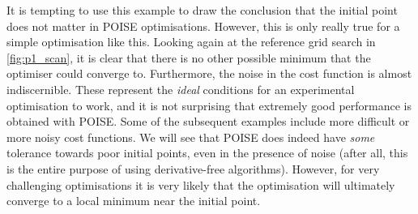 It is tempting to use this example to draw the conclusion that the initial point does not matter in POISE optimisations.
However, this is only really true for a simple optimisation like this.
Looking again at the reference grid search in \cref{fig:p1_scan}, it is clear that there is no other possible minimum that the optimiser could converge to.
Furthermore, the noise in the cost function is almost indiscernible.
These represent the \textit{ideal} conditions for an experimental optimisation to work, and it is not surprising that extremely good performance is obtained with POISE.
Some of the subsequent examples include more difficult or more noisy cost functions.
We will see that POISE does indeed have \textit{some} tolerance towards poor initial points, even in the presence of noise (after all, this is the entire purpose of using derivative-free algorithms).
However, for very challenging optimisations it is very likely that the optimisation will ultimately converge to a local minimum near the initial point.
